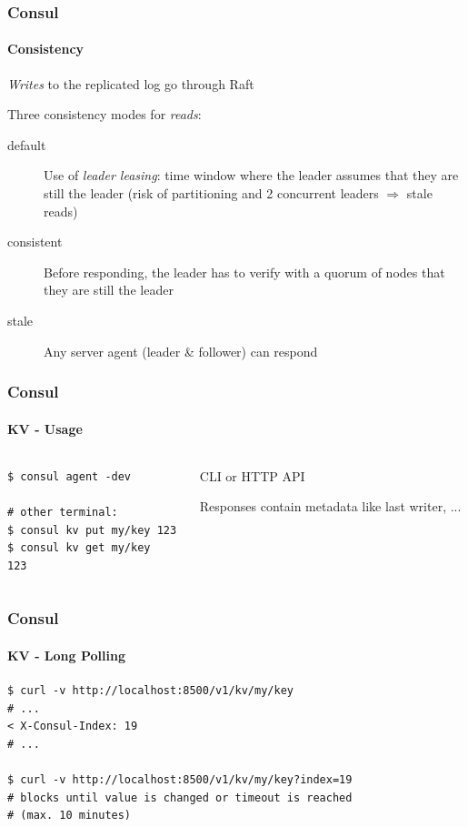 \begin{frame}
		\frametitle{Consul}
		\framesubtitle{Consistency}

		\emph{Writes} to the replicated log go through Raft

		Three consistency modes for \emph{reads}:
		\begin{description}
			\item[default] Use of \emph{leader leasing}: time window where the leader assumes that they are still the leader (risk of partitioning and 2 concurrent leaders $\Rightarrow$ stale reads)
			\item[consistent] Before responding, the leader has to verify with a quorum of nodes that they are still the leader
			\item[stale] Any server agent (leader \& follower) can respond
		\end{description}
\end{frame}

\begin{frame}[fragile]
	\frametitle{Consul}
	\framesubtitle{KV - Usage}

	\begin{columns}[t]
		\begin{column}{0.45\textwidth}
			\begin{verbatim}
$ consul agent -dev

# other terminal:
$ consul kv put my/key 123
$ consul kv get my/key
123
			\end{verbatim}
		\end{column}
		\begin{column}{0.55\textwidth}
			CLI or HTTP API

			Responses contain metadata like last writer, ...
		\end{column}
	\end{columns}
\end{frame}

\begin{frame}[fragile]
	\frametitle{Consul}
	\framesubtitle{KV - Long Polling}
	\begin{verbatim}
$ curl -v http://localhost:8500/v1/kv/my/key
# ...
< X-Consul-Index: 19
# ...

$ curl -v http://localhost:8500/v1/kv/my/key?index=19
# blocks until value is changed or timeout is reached
# (max. 10 minutes)
	\end{verbatim}
\end{frame}
